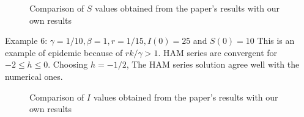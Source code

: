 \documentclass[10pt]{article}
\begin{document}
  \begin{figure}[htbp]
  \centering
  \hfill
  \caption{Comparison of \(S\) values obtained from the paper's results with our own results  }
   \end{figure}
\newpage
Example 6: $\gamma=1 / 10, \beta=1, r=1 / 15, I(0)=25$ and $S(0)=10$
This is an example of epidemic because of $r k / \gamma>1$.  HAM series are convergent for $-2 \leqslant h \leqslant 0$. Choosing $h=-1 / 2$, The HAM series solution agree well with the numerical ones.
\begin{figure}[!htbp]
  \centering
  \hfill
  \caption{Comparison of \(I\) values obtained from the paper's results with our own results  }
\end{figure}
\end{document}

